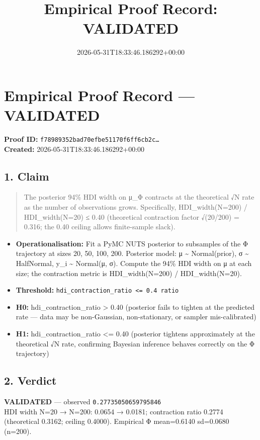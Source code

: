 \documentclass{article}
\title{Empirical Proof Record: VALIDATED}
\date{2026-05-31T18:33:46.186292+00:00}
\begin{document}
\maketitle
\section*{Empirical Proof Record --- \textcolor{validated}{\textbf{VALIDATED}}}
\textbf{Proof ID:} \texttt{f78989352bad70efbe51170f6ff6cb2c\dots}\\
\textbf{Created:} 2026-05-31T18:33:46.186292+00:00
\subsection*{1. Claim}
\begin{quote}The posterior 94\% HDI width on μ\_Φ contracts at the theoretical √N rate as the number of observations grows. Specifically, HDI\_width(N=200) / HDI\_width(N=20) ≤ 0.40 (theoretical contraction factor √(20/200) = 0.316; the 0.40 ceiling allows finite-sample slack).\end{quote}
\begin{itemize}
\item \textbf{Operationalisation:} Fit a PyMC NUTS posterior to subsamples of the Φ trajectory at sizes 20, 50, 100, 200. Posterior model: μ \textasciitilde{} Normal(prior), σ \textasciitilde{} HalfNormal, y\_i \textasciitilde{} Normal(μ, σ). Compute the 94\% HDI width on μ at each size; the contraction metric is HDI\_width(N=200) / HDI\_width(N=20).
\item \textbf{Threshold:} \texttt{hdi\_contraction\_ratio <= 0.4 ratio}
\item \textbf{H0:} hdi\_contraction\_ratio > 0.40 (posterior fails to tighten at the predicted rate — data may be non-Gaussian, non-stationary, or sampler mis-calibrated)
\item \textbf{H1:} hdi\_contraction\_ratio <= 0.40 (posterior tightens approximately at the theoretical √N rate, confirming Bayesian inference behaves correctly on the Φ trajectory)
\end{itemize}
\subsection*{2. Verdict}
\textcolor{validated}{\textbf{VALIDATED}} --- observed \texttt{0.27735050659795846}\\
HDI width N=20 → N=200: 0.0654 → 0.0181; contraction ratio 0.2774 (theoretical 0.3162; ceiling 0.4000). Empirical Φ mean=0.6140 sd=0.0680 (n=200).
\end{document}
